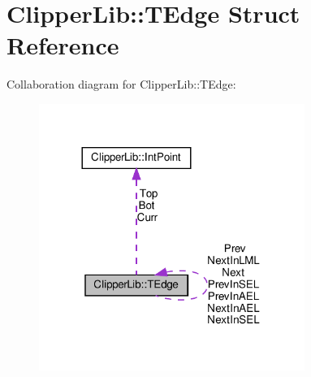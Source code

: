 \hypertarget{struct_clipper_lib_1_1_t_edge}{}\section{Clipper\+Lib\+:\+:T\+Edge Struct Reference}
\label{struct_clipper_lib_1_1_t_edge}


Collaboration diagram for Clipper\+Lib\+:\+:T\+Edge\+:
\nopagebreak
\begin{figure}[H]
\begin{center}
\leavevmode
\includegraphics[width=245pt]{struct_clipper_lib_1_1_t_edge__coll__graph}
\end{center}
\end{figure}
